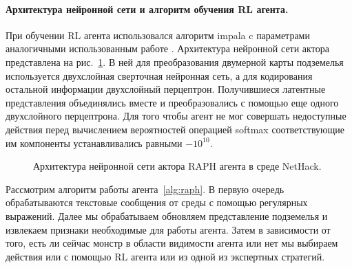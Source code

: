 \paragraph{Архитектура нейронной сети и алгоритм обучения RL агента.} При обучении RL агента использовался алгоритм impala \cite{impala} c параметрами аналогичными использованным работе \cite{kuettler2020nethack}. Архитектура нейронной сети актора представлена на рис.~\ref{fig:raph_arch}. В ней для преобразования двумерной карты подземелья используется двухслойная сверточная нейронная сеть, а для кодирования остальной информации двухслойный перцептрон. Получившиеся латентные представления объединялись вместе и преобразовались с помощью еще одного двухслойного перцептрона. Для того чтобы агент не мог совершать недоступные действия перед вычислением вероятностей операцией softmax соответствующие им компоненты устанавливались равными $-10^{10}$. 

\begin{figure}[ht]
\caption{Архитектура нейронной сети актора RAPH агента в среде NetHack.}
    \label{fig:raph_arch}
\end{figure}

Рассмотрим алгоритм работы агента~\ref{alg:raph}. В первую очередь обрабатываются текстовые сообщения от среды с помощью регулярных выражений. Далее мы обрабатываем обновляем представление подземелья и извлекаем признаки необходимые для работы агента. Затем в зависимости от того, есть ли сейчас монстр в области видимости агента или нет мы выбираем действия или с помощью RL агента или из одной из экспертных стратегий.


